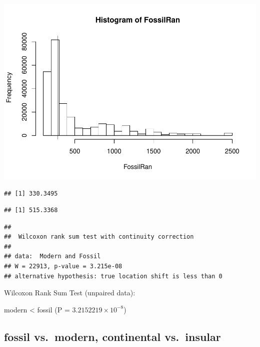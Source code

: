 \documentclass[]{article}
\begin{document}
\includegraphics{MA_JJ_files/figure-latex/randon sampling modern fossil-1.pdf}

\begin{verbatim}
## [1] 330.3495
\end{verbatim}

\begin{verbatim}
## [1] 515.3368
\end{verbatim}

\begin{verbatim}
## 
##  Wilcoxon rank sum test with continuity correction
## 
## data:  Modern and Fossil
## W = 22913, p-value = 3.215e-08
## alternative hypothesis: true location shift is less than 0
\end{verbatim}

Wilcoxon Rank Sum Test (unpaired data):

modern \textless{} fossil (P = \(3.2152219\times 10^{-8}\))

\newpage

\subsection{fossil vs.~modern, continental
vs.~insular}\label{fossil-vs.modern-continental-vs.insular}
\end{document}
